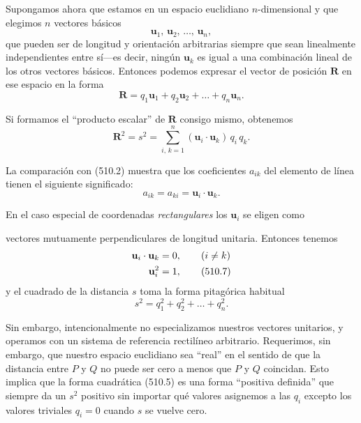 \documentclass[12pt,a4paper]{book}
\newcommand{\vect}[1]{\mathbf{#1}}
\begin{document}
Supongamos ahora que estamos en un espacio euclidiano $n$-dimensional y que elegimos $n$ vectores básicos
\begin{equation}
\vect{u}_1, \, \vect{u}_2, \, \ldots, \, \vect{u}_n, \tag{510.3}
\end{equation}
que pueden ser de longitud y orientación arbitrarias siempre que sean linealmente independientes entre sí---es decir, ningún $\vect{u}_k$ es igual a una combinación lineal de los otros vectores básicos. Entonces podemos expresar el vector de posición $\vect{R}$ en ese espacio en la forma
\begin{equation}
\vect{R} = q_1 \vect{u}_1 + q_2 \vect{u}_2 + \ldots + q_n \vect{u}_n. \tag{510.4}
\end{equation}

Si formamos el ``producto escalar'' de $\vect{R}$ consigo mismo, obtenemos
\begin{equation}
\vect{R}^2 = s^2 = \sum_{i,\,k=1}^{n} (\vect{u}_i \cdot \vect{u}_k)\,q_i\,q_k. \tag{510.5}
\end{equation}

La comparación con (510.2) muestra que los coeficientes $a_{ik}$ del elemento de línea tienen el siguiente significado:
\begin{equation}
a_{ik} = a_{ki} = \vect{u}_i \cdot \vect{u}_k. \tag{510.6}
\end{equation}

En el caso especial de coordenadas \textit{rectangulares} los $\vect{u}_i$ se eligen como


vectores mutuamente perpendiculares de longitud unitaria. Entonces tenemos
\begin{align}
\vect{u}_i \cdot \vect{u}_k &= 0, \qquad (i \neq k) \notag \\
\vect{u}_i^2 &= 1, \tag{510.7}
\end{align}
y el cuadrado de la distancia $s$ toma la forma pitagórica habitual
\begin{equation}
s^2 = q_1^2 + q_2^2 + \ldots + q_n^2. \tag{510.8}
\end{equation}

Sin embargo, intencionalmente no especializamos nuestros vectores unitarios, y operamos con un sistema de referencia rectilíneo arbitrario. Requerimos, sin embargo, que nuestro espacio euclidiano sea ``real'' en el sentido de que la distancia entre $P$ y $Q$ no puede ser cero a menos que $P$ y $Q$ coincidan. Esto implica que la forma cuadrática (510.5) es una forma ``positiva definida'' que siempre da un $s^2$ positivo sin importar qué valores asignemos a las $q_i$ excepto los valores triviales $q_i = 0$ cuando $s$ se vuelve cero.
\end{document}
